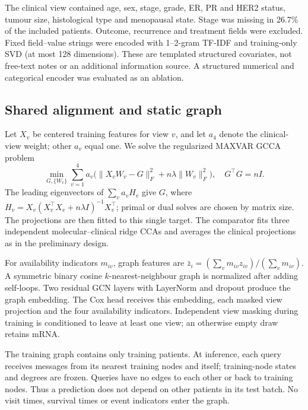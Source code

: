 \documentclass{article}
\begin{document}
The clinical view contained age, sex, stage, grade, ER, PR and HER2 status, tumour
size, histological type and menopausal state. Stage was missing in 26.7\% of
the included patients. Outcome, recurrence and treatment fields were excluded.
Fixed field--value strings were encoded with 1--2-gram TF-IDF and training-only
SVD (at most 128 dimensions). These are templated structured covariates,
not free-text notes or an additional information source. A structured
numerical and categorical encoder was evaluated as an ablation.

\subsection{Shared alignment and static graph}
Let $X_v$ be centered training features for view $v$, and let $a_4$ denote the
clinical-view weight; other $a_v$ equal one. We solve the regularized MAXVAR
GCCA problem
\begin{equation}
\min_{G,\{W_v\}}\sum_{v=1}^{4}a_v
  \big(\|X_vW_v-G\|_F^2+n\lambda\|W_v\|_F^2\big),\quad G^\top G=nI.
\end{equation}
The leading eigenvectors of $\sum_v a_vH_v$ give $G$, where
$H_v=X_v(X_v^\top X_v+n\lambda I)^{-1}X_v^\top$; primal or dual solves
are chosen by matrix size. The projections are then fitted to this single
target. The comparator fits three independent molecular--clinical ridge
CCAs and averages the clinical projections as in the preliminary design.

For availability indicators $m_{iv}$, graph features are
$\bar z_i=(\sum_vm_{iv}z_{iv})/(\sum_vm_{iv})$. A symmetric binary cosine
$k$-nearest-neighbour graph is normalized after adding self-loops. Two
residual GCN layers with LayerNorm and dropout produce the graph embedding.
The Cox head receives this embedding, each masked view projection and the
four availability indicators. Independent view masking during training is
conditioned to leave at least one view; an otherwise empty draw retains mRNA.

The training graph contains only training patients. At inference, each query
receives messages from its nearest training nodes and itself; training-node
states and degrees are frozen. Queries have no edges to each other or back
to training nodes. Thus a prediction does not depend on other patients in its
test batch. No visit times, survival times or event indicators enter the graph.
\end{document}
